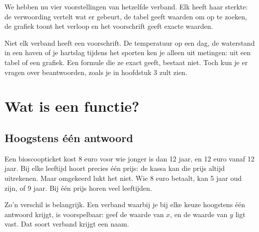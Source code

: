 
We hebben nu vier voorstellingen van hetzelfde verband. Elk heeft haar sterkte: de verwoording vertelt wat er gebeurt, de tabel geeft waarden om op te zoeken, de grafiek toont het verloop en het voorschrift geeft exacte waarden.

Niet elk verband heeft een voorschrift. De temperatuur op een dag, de waterstand in een haven of je hartslag tijdens het sporten ken je alleen uit metingen: uit een tabel of een grafiek. Een formule die ze exact geeft, bestaat niet. Toch kun je er vragen over beantwoorden, zoals je in hoofdstuk 3 zult zien.

\begin{oefeningen}
\end{oefeningen}

\section{Wat is een functie?}

\subsection{Hoogstens één antwoord}

Een bioscoopticket kost 8 euro voor wie jonger is dan 12 jaar, en 12 euro vanaf 12 jaar. Bij elke leeftijd hoort precies één prijs: de kassa kan die prijs altijd uitrekenen. Maar omgekeerd lukt het niet. Wie 8 euro betaalt, kan 5 jaar oud zijn, of 9 jaar. Bij één prijs horen veel leeftijden.

Zo'n verschil is belangrijk. Een verband waarbij je bij elke keuze hoogstens één antwoord krijgt, is voorspelbaar: geef de waarde van $x$, en de waarde van $y$ ligt vast. Dat soort verband krijgt een naam.

